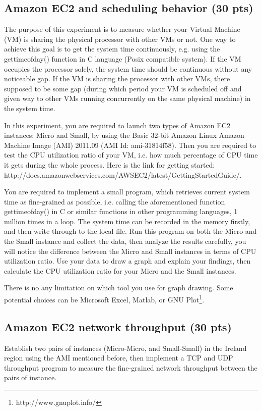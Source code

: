 \documentclass[12pt, a4paper]{article}
\begin{document}
\subsection{Amazon EC2 and scheduling behavior (30 pts)}
The purpose of this experiment is to measure whether your Virtual Machine (VM) is sharing the physical processor with other VMs or not. One way to achieve this goal is to get the system time continuously, e.g. using the gettimeofday() function in C language (Posix compatible system). If the VM occupies the processor solely, the system time should be continuous without any noticeable gap. If the VM is sharing the processor with other VMs, there supposed to be some gap (during which period your VM is scheduled off and given way to other VMs running concurrently on the same physical machine) in the system time.

In this experiment, you are required to launch two types of Amazon EC2 instances: Micro and Small, by using the Basic 32-bit Amazon Linux Amazon Machine Image (AMI) 2011.09 (AMI Id: ami-31814f58). Then you are required to test the CPU utilization ratio of your VM, i.e. how much percentage of CPU time it gets during the whole process. Here is the link for getting started: http://docs.amazonwebservices.com/AWSEC2/latest/GettingStartedGuide/. 

You are required to implement a small program, which retrieves current system time as fine-grained as possible, i.e. calling the aforementioned function gettimeofday() in C or similar functions in other programming languages, 1 million times in a loop. The system time can be recorded in the memory firstly, and then write through to the local file. Run this program on both the Micro and the Small instance and collect the data, then analyze the results carefully, you will notice the difference between the Micro and Small instances in terms of CPU utilization ratio. Use your data to draw a graph and explain your findings, then calculate the CPU utilization ratio for your Micro and the Small instances.

There is no any limitation on which tool you use for graph drawing. Some potential choices can be Microsoft Excel, Matlab, or GNU Plot\footnote{http://www.gnuplot.info/}.
\subsection{Amazon EC2 network throughput (30 pts)}
Establish two pairs of instances (Micro-Micro, and Small-Small) in the Ireland region using the AMI mentioned before, then implement a TCP and UDP throughput program to measure the fine-grained network throughput between the pairs of instance.
\end{document}
